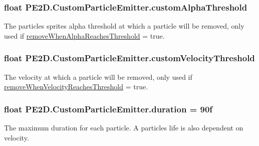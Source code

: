 \subsubsection[{custom\+Alpha\+Threshold}]{\setlength{\rightskip}{0pt plus 5cm}float P\+E2\+D.\+Custom\+Particle\+Emitter.\+custom\+Alpha\+Threshold}\label{class_p_e2_d_1_1_custom_particle_emitter_a7bbf2eca6359446ab220db98001ca1aa}


The particles sprites alpha threshold at which a particle will be removed, only used if \hyperlink{class_p_e2_d_1_1_custom_particle_emitter_a2d9f43eacfbc11f6fcfb546985ca9291}{remove\+When\+Alpha\+Reaches\+Threshold} = true. 

\hypertarget{class_p_e2_d_1_1_custom_particle_emitter_adb6bfa354cb3cad1123ea63b6d8696b5}{}
\subsubsection[{custom\+Velocity\+Threshold}]{\setlength{\rightskip}{0pt plus 5cm}float P\+E2\+D.\+Custom\+Particle\+Emitter.\+custom\+Velocity\+Threshold}\label{class_p_e2_d_1_1_custom_particle_emitter_adb6bfa354cb3cad1123ea63b6d8696b5}


The velocity at which a particle will be removed, only used if \hyperlink{class_p_e2_d_1_1_custom_particle_emitter_ad533ffa87500059c24f4883b4258ef1c}{remove\+When\+Velocity\+Reaches\+Threshold} = true. 

\hypertarget{class_p_e2_d_1_1_custom_particle_emitter_a9dea38f5fcd24b14763dd9d7fc26cb7a}{}
\subsubsection[{duration}]{\setlength{\rightskip}{0pt plus 5cm}float P\+E2\+D.\+Custom\+Particle\+Emitter.\+duration = 90f}\label{class_p_e2_d_1_1_custom_particle_emitter_a9dea38f5fcd24b14763dd9d7fc26cb7a}


The maximum duration for each particle. A particles life is also dependent on velocity. 

